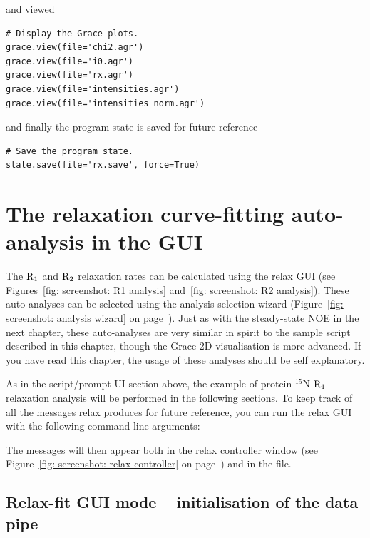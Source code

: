 and viewed

\begin{lstlisting}[firstnumber=88]
# Display the Grace plots.
grace.view(file='chi2.agr')
grace.view(file='i0.agr')
grace.view(file='rx.agr')
grace.view(file='intensities.agr')
grace.view(file='intensities_norm.agr')
\end{lstlisting}

and finally the program state is saved for future reference

\begin{lstlisting}[firstnumber=95]
# Save the program state.
state.save(file='rx.save', force=True)
\end{lstlisting}




\newpage
\section{The relaxation curve-fitting auto-analysis in the GUI}

The $\mathrm{R}_1$ and $\mathrm{R}_2$ relaxation rates can be calculated using the relax GUI (see Figures~\ref{fig: screenshot: R1 analysis} and~\ref{fig: screenshot: R2 analysis}).
These auto-analyses can be selected using the analysis selection wizard (Figure~\ref{fig: screenshot: analysis wizard} on page~\pageref{fig: screenshot: analysis wizard}).
Just as with the steady-state NOE in the next chapter, these auto-analyses are very similar in spirit to the sample script described in this chapter, though the Grace 2D visualisation is more advanced.
If you have read this chapter, the usage of these analyses should be self explanatory.

As in the script/prompt UI section above, the example of protein $^{15}$N $\mathrm{R}_1$ relaxation analysis will be performed in the following sections.
To keep track of all the messages relax produces for future reference, you can run the relax GUI with the following command line arguments:


The messages will then appear both in the relax controller window (see Figure~\ref{fig: screenshot: relax controller} on page~\pageref{fig: screenshot: relax controller}) and in the  file.



\subsection{Relax-fit GUI mode -- initialisation of the data pipe}

